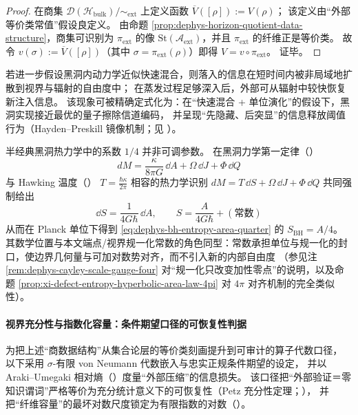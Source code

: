 \begin{proof}
在商集 \(\mathcal{D}(\mathcal{H}_{\mathrm{bulk}})/{\sim_{\mathrm{ext}}}\) 上定义函数 \(\overline V([\rho]) := V(\rho)\)；
该定义由“外部等价类常值”假设良定义。
由命题 \ref{prop:dephys-horizon-quotient-data-structure}，商集可识别为 \(\pi_{\mathrm{ext}}\) 的像
\(\mathrm{St}(\mathcal{A}_{\mathrm{ext}})\)，并且 \(\pi_{\mathrm{ext}}\) 的纤维正是等价类。
故令 \(v(\sigma):=\overline V([\rho])\)（其中 \(\sigma=\pi_{\mathrm{ext}}(\rho)\)）即得 \(V=v\circ\pi_{\mathrm{ext}}\)。
证毕。
\end{proof}

\begin{remark}\label{rem:dephys-horizon-scrambler-recovery-threshold}
若进一步假设黑洞内动力学近似快速混合，则落入的信息在短时间内被非局域地扩散到视界与辐射的自由度中；
在蒸发过程足够深入后，外部可从辐射中较快恢复新注入信息。
该现象可被精确定式化为：在“快速混合 + 单位演化”的假设下，黑洞实现接近最优的量子擦除信道编码，
并呈现“先隐藏、后突显”的信息释放阈值行为（Hayden--Preskill 镜像机制；见 \cite{HaydenPreskill2007BlackHolesMirrors}）。
\end{remark}

\begin{proposition}\label{prop:dephys-one-quarter-normalization}
半经典黑洞热力学中的系数 \(1/4\) 并非可调参数。
在黑洞力学第一定律（\cite{BardeenCarterHawking1973FourLaws}）
\[
dM=\frac{\kappa}{8\pi G}\,\dd A+\Omega\,\dd J+\Phi\,\dd Q
\]
与 Hawking 温度（\cite{Hawking1975ParticleCreation}）
\(
T=\frac{\hbar\kappa}{2\pi}
\)
相容的热力学识别
\(
dM=T\,\dd S+\Omega\,\dd J+\Phi\,\dd Q
\)
共同强制给出
\[
\boxed{\;
\dd S=\frac{1}{4G\hbar}\,\dd A,\qquad
S=\frac{A}{4G\hbar}+(\text{常数})\;}
\]
从而在 Planck 单位下得到 \eqref{eq:dephys-bh-entropy-area-quarter} 的 \(S_{\mathrm{BH}}=A/4\)。
其数学位置与本文端点/视界规一化常数的角色同型：常数承担单位与规一化的封口，使边界几何量与可加对数势对齐，而不引入新的内部自由度
（参见注 \ref{rem:dephys-cayley-scale-gauge-four} 对“规一化只改变加性零点”的说明，以及命题 \ref{prop:xi-defect-entropy-hyperbolic-area-law-4pi} 对 \(4\pi\) 对齐机制的完全类似性）。
\end{proposition}

\paragraph{视界充分性与指数化容量：条件期望口径的可恢复性判据}
为把上述“商数据结构”从集合论层的等价类刻画提升到可审计的算子代数口径，
以下采用 \(\sigma\)-有限 von Neumann 代数嵌入与忠实正规条件期望的设定，
并以 Araki--Umegaki 相对熵（\cite{Araki1976RelativeEntropyVonNeumann}）度量“外部压缩”的信息损失。
该口径把“外部验证＝零知识谓词”严格等价为充分统计意义下的可恢复性（Petz 充分性定理；\cite{Petz1986SufficientSubalgebrasRelativeEntropy,Petz2003MonotonicityRelativeEntropyRevisited}），
并把“纤维容量”的最坏对数尺度锁定为有限指数的对数（\cite{PimsnerPopa1986EntropyIndexSubfactors,Hiai1991MinimumIndexSubfactorsEntropyII}）。

